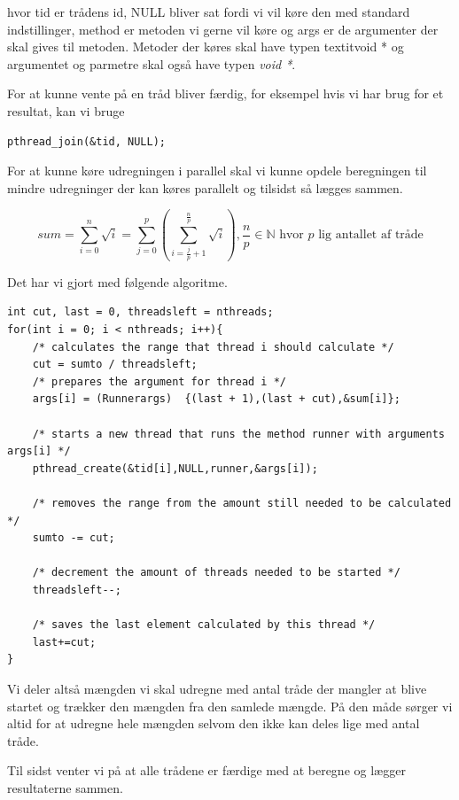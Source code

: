 \documentclass[danish]{report}
\begin{document}
hvor tid er trådens id, NULL bliver sat fordi vi vil køre den med standard indstillinger, method er metoden vi gerne vil køre og args er de argumenter der skal gives til metoden. Metoder der køres skal have typen textit{void *} og argumentet og parmetre skal også have typen \textit{void *}.

For at kunne vente på en tråd bliver færdig, for eksempel hvis vi har brug for et resultat, kan vi bruge 

\begin{lstlisting}
pthread_join(&tid, NULL);
\end{lstlisting}


For at kunne køre udregningen i parallel skal vi kunne opdele beregningen til mindre udregninger der kan køres parallelt og tilsidst så lægges sammen. 

\begin{equation*}
sum = \displaystyle\sum\limits_{i=0}^n \sqrt{i} = \displaystyle\sum\limits_{j=0}^{p} \left( \displaystyle\sum\limits_{i=\frac{j}{p}+1}^{\frac{n}{p}} \sqrt{i} \right), \frac{n}{p} \in \mathbb{N} \text{ hvor } p \text{ lig antallet af tråde}
\end{equation*}


Det har vi gjort med følgende algoritme.

\begin{lstlisting}
int cut, last = 0, threadsleft = nthreads;
for(int i = 0; i < nthreads; i++){
    /* calculates the range that thread i should calculate */
    cut = sumto / threadsleft;
    /* prepares the argument for thread i */
    args[i] = (Runnerargs)  {(last + 1),(last + cut),&sum[i]};

    /* starts a new thread that runs the method runner with arguments args[i] */
    pthread_create(&tid[i],NULL,runner,&args[i]);

    /* removes the range from the amount still needed to be calculated */
    sumto -= cut;

    /* decrement the amount of threads needed to be started */
    threadsleft--;

    /* saves the last element calculated by this thread */
    last+=cut;
}
\end{lstlisting}

Vi deler altså mængden vi skal udregne med antal tråde der mangler at blive startet og trækker den mængden fra den samlede mængde. På den måde sørger vi altid for at udregne hele mængden selvom den ikke kan deles lige med antal tråde. 

Til sidst venter vi på at alle trådene er færdige med at beregne og lægger resultaterne sammen.
\end{document}
